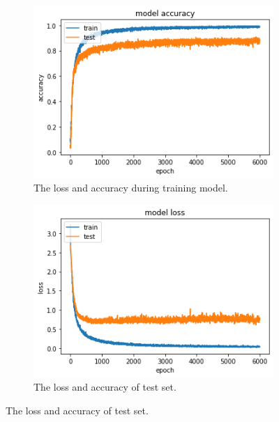 \documentclass[%
  article,%
  10pt,%
  a4paper,%
  fleqn,%
  oneside,%
  sumario = tradicional,%
  chapter = TITLE,%
  section = TITLE,%
]{abntex2}
\begin{document}
\begin{figure}
\centering
\begin{minipage}[b]{.4\textwidth}
\begin{figure}[H]
  \centering
  \includegraphics[width = \columnwidth]{./Figuras/losscnn}
  \caption{The loss and accuracy during training model.}
  \label{fig:losscnn}
\end{figure}
\end{minipage}\qquad
\begin{minipage}[b]{.4\textwidth}
\begin{figure}[H]
  \centering
  \includegraphics[width = \columnwidth]{./Figuras/acccnn}
   \caption{The loss and accuracy of test set.}
   \label{fig:acccnn}
\end{figure}
\end{minipage}
\end{figure}
\end{document}
